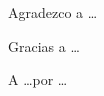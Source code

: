 \thispagestyle{abstract}
\begin{flushright}
    \vspace*{5cm}
    \medskip
    Agradezco a  \dots

    Gracias a \dots

    A \dots por \dots
\end{flushright}


